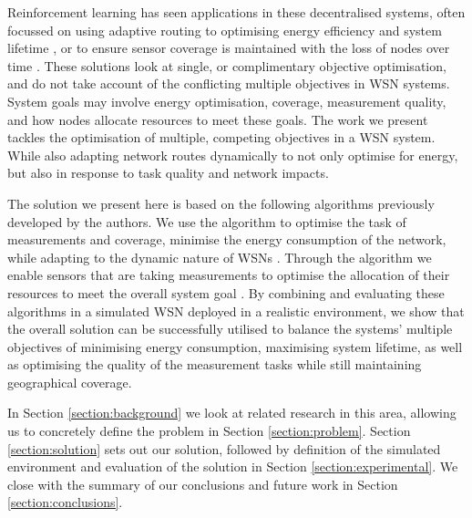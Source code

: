 \ifdefined\DEBUG {} \else \fi
Reinforcement learning has seen applications in these decentralised systems, often focussed on using adaptive routing  to optimising energy efficiency and system lifetime \citep{ 10.1504/IJCNDS.2012.048871, Kulkarnib}, or to ensure sensor coverage is maintained with the loss of nodes over time \citep{Sharma2020}. These solutions look at single, or complimentary objective optimisation, and do not take account of the conflicting multiple objectives in WSN systems. System goals may involve energy optimisation, coverage, measurement quality, and how nodes allocate resources to meet these goals. The work we present tackles the optimisation of multiple, competing objectives in a WSN system. While also adapting network routes dynamically to not only optimise for energy, but also in response to task quality and network impacts.

\ifdefined\DEBUG {} \else \fi
The solution we present here is based on the following algorithms previously developed by the authors. We use the \acronymATARIA{}{} algorithm to optimise the task of measurements and coverage, minimise the energy consumption of the network, while adapting to the dynamic nature of WSNs \citep{creech2021dynamic}. Through the \acronymMGRAO{}{} algorithm we enable sensors that are taking measurements to optimise the allocation of their resources to meet the overall system goal \citep{creech2021resource}. By combining and evaluating these algorithms in a simulated WSN deployed in a realistic environment, we show that the overall solution can be successfully utilised to balance the systems' multiple objectives of minimising energy consumption, maximising system lifetime, as well as optimising the quality of the measurement tasks while still maintaining geographical coverage.

\ifdefined\DEBUG {} \else \fi
In Section \ref{section:background} we look at related research in this area, allowing us to concretely define the problem in Section \ref{section:problem}. Section \ref{section:solution} sets out our solution, followed by definition of the simulated environment and evaluation of the solution in Section \ref{section:experimental}. We close with the summary of our conclusions and future work in Section \ref{section:conclusions}.
